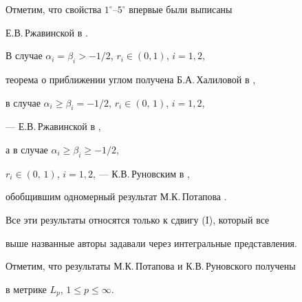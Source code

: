 Отметим, что свойства $1^\circ$--$5^\circ$ впервые были выписаны 


Е.В.\,Ржавинской в \cite{Rzh-VIN}.





В случае $\alpha_i=\beta_i>-1/2$, $r_i\in(0,1)$, $i=1,2$,


теорема о приближении углом получена Б.А.\,Халиловой в \cite{Khal-diss},


в случае $\alpha_i\ge\beta_i=-1/2$, $r_i\in(0,\,1)$, $i=1,2$,


--- Е.В.\,Ржавинской в \cite{Rzh-VIN},


а в случае $\alpha_i\ge\beta_i\ge-1/2$,


$r_i\in(0,\,1)$, $i=1,2$, --- К.В.\,Руновским в \cite{Run},


обобщившим одномерный результат М.К.\,Потапова \cite{Potap-2}.


Все эти результаты относятся только к сдвигу (I), который все 


выше названные авторы задавали через интегральные представления.


Отметим, что результаты М.К.\,Потапова и К.В.\,Руновского получены


в метрике $L_p$, $1\le p \le\infty$.





